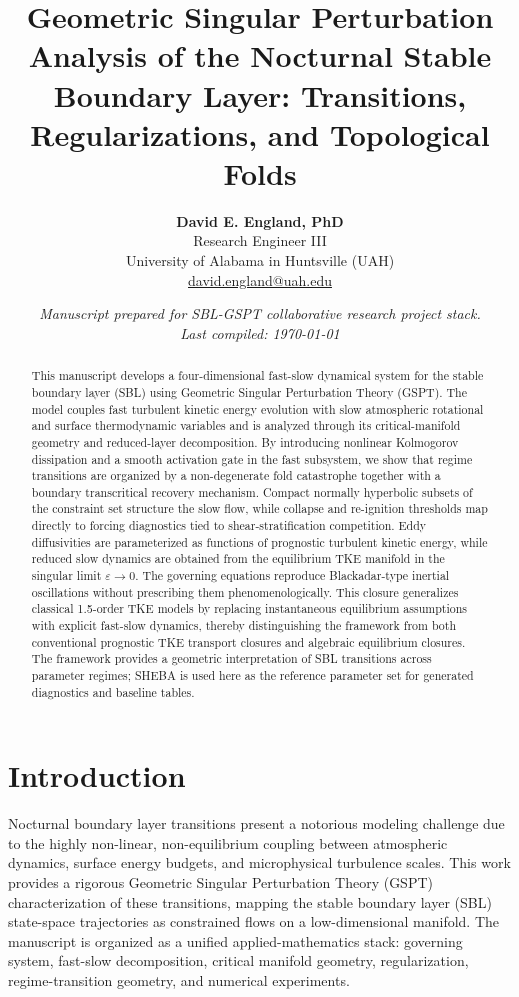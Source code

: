 \documentclass[11pt,letterpaper]{article}
\title{\textbf{Geometric Singular Perturbation Analysis of the Nocturnal Stable Boundary Layer: Transitions, Regularizations, and Topological Folds}}
\author{
    \textbf{David E. England, PhD} \\
    \small Research Engineer III \\
    \small University of Alabama in Huntsville (UAH) \\
    \small \href{mailto:david.england@uah.edu}{david.england@uah.edu}
}
\date{\small\itshape Manuscript prepared for SBL-GSPT collaborative research project stack. \\ Last compiled: \today}
\begin{document}
\maketitle

\begin{abstract}
This manuscript develops a four-dimensional fast-slow dynamical system for the stable boundary layer (SBL) using Geometric Singular Perturbation Theory (GSPT). The model couples fast turbulent kinetic energy evolution with slow atmospheric rotational and surface thermodynamic variables and is analyzed through its critical-manifold geometry and reduced-layer decomposition. By introducing nonlinear Kolmogorov dissipation and a smooth activation gate in the fast subsystem, we show that regime transitions are organized by a non-degenerate fold catastrophe together with a boundary transcritical recovery mechanism. Compact normally hyperbolic subsets of the constraint set structure the slow flow, while collapse and re-ignition thresholds map directly to forcing diagnostics tied to shear-stratification competition. Eddy diffusivities are parameterized as functions of prognostic turbulent kinetic energy, while reduced slow dynamics are obtained from the equilibrium TKE manifold in the singular limit $\varepsilon\to 0$. The governing equations reproduce Blackadar-type inertial oscillations without prescribing them phenomenologically. This closure generalizes classical 1.5-order TKE models by replacing instantaneous equilibrium assumptions with explicit fast-slow dynamics, thereby distinguishing the framework from both conventional prognostic TKE transport closures and algebraic equilibrium closures. The framework provides a geometric interpretation of SBL transitions across parameter regimes; SHEBA is used here as the reference parameter set for generated diagnostics and baseline tables.
\end{abstract}


\section{Introduction}
\label{sec:introduction}
Nocturnal boundary layer transitions present a notorious modeling challenge due to the highly non-linear, non-equilibrium coupling between atmospheric dynamics, surface energy budgets, and microphysical turbulence scales. This work provides a rigorous Geometric Singular Perturbation Theory (GSPT) characterization of these transitions, mapping the stable boundary layer (SBL) state-space trajectories as constrained flows on a low-dimensional manifold.
The manuscript is organized as a unified applied-mathematics stack: governing system, fast-slow decomposition, critical manifold geometry, regularization, regime-transition geometry, and numerical experiments.
\end{document}
